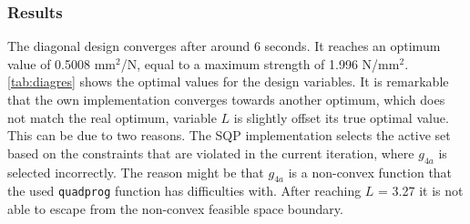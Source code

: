 \subsubsection{Results}
The diagonal design converges after around 6 seconds. It reaches an optimum value of 0.5008 mm$^2$/N, equal to a maximum strength of 1.996 N/mm$^2$. \autoref{tab:diagres} shows the optimal values for the design variables. It is remarkable that the own implementation converges towards another optimum, which does not match the real optimum, variable $L$ is slightly offset its true optimal value. This can be due to two reasons. The SQP implementation selects the active set based on the constraints that are violated in the current iteration, where $g_{4a}$ is selected incorrectly. The reason might be that $g_{4a}$ is a non-convex function that the used \texttt{quadprog} function has difficulties with. After reaching $L$ = 3.27 it is not able to escape from the non-convex feasible space boundary. \\



